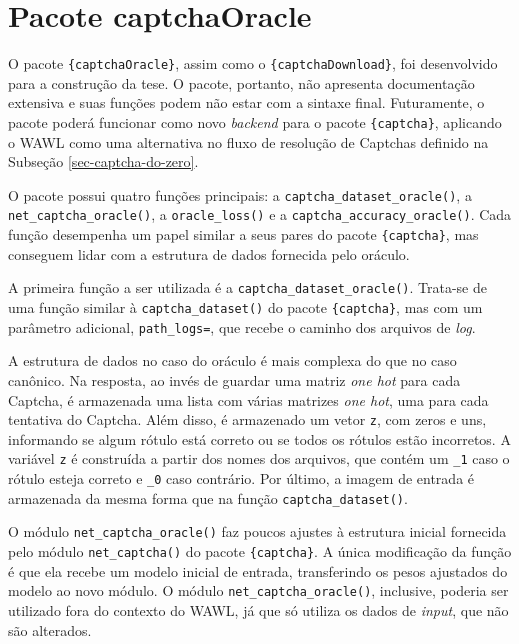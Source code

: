 \documentclass[12pt,twoside,brazilian]{book}
\begin{document}
\hypertarget{sec-pacote-oracle}{%
\section{Pacote captchaOracle}\label{sec-pacote-oracle}}

O pacote \texttt{\{captchaOracle\}}, assim como o
\texttt{\{captchaDownload\}}, foi desenvolvido para a construção da
tese. O pacote, portanto, não apresenta documentação extensiva e suas
funções podem não estar com a sintaxe final. Futuramente, o pacote
poderá funcionar como novo \emph{backend} para o pacote
\texttt{\{captcha\}}, aplicando o WAWL como uma alternativa no fluxo de
resolução de Captchas definido na Subseção \ref{sec-captcha-do-zero}.

O pacote possui quatro funções principais: a
\texttt{captcha\_dataset\_oracle()}, a \texttt{net\_captcha\_oracle()},
a \texttt{oracle\_loss()} e a \texttt{captcha\_accuracy\_oracle()}. Cada
função desempenha um papel similar a seus pares do pacote
\texttt{\{captcha\}}, mas conseguem lidar com a estrutura de dados
fornecida pelo oráculo.

A primeira função a ser utilizada é a
\texttt{captcha\_dataset\_oracle()}. Trata-se de uma função similar à
\texttt{captcha\_dataset()} do pacote \texttt{\{captcha\}}, mas com um
parâmetro adicional, \texttt{path\_logs=}, que recebe o caminho dos
arquivos de \emph{log}.

A estrutura de dados no caso do oráculo é mais complexa do que no caso
canônico. Na resposta, ao invés de guardar uma matriz \emph{one hot}
para cada Captcha, é armazenada uma lista com várias matrizes \emph{one
hot}, uma para cada tentativa do Captcha. Além disso, é armazenado um
vetor \texttt{z}, com zeros e uns, informando se algum rótulo está
correto ou se todos os rótulos estão incorretos. A variável \texttt{z} é
construída a partir dos nomes dos arquivos, que contém um \texttt{\_1}
caso o rótulo esteja correto e \texttt{\_0} caso contrário. Por último,
a imagem de entrada é armazenada da mesma forma que na função
\texttt{captcha\_dataset()}.

O módulo \texttt{net\_captcha\_oracle()} faz poucos ajustes à estrutura
inicial fornecida pelo módulo \texttt{net\_captcha()} do pacote
\texttt{\{captcha\}}. A única modificação da função é que ela recebe um
modelo inicial de entrada, transferindo os pesos ajustados do modelo ao
novo módulo. O módulo \texttt{net\_captcha\_oracle()}, inclusive,
poderia ser utilizado fora do contexto do WAWL, já que só utiliza os
dados de \emph{input}, que não são alterados.
\end{document}
